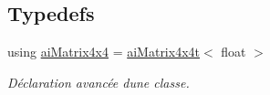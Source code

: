 \subsection*{Typedefs}
\begin{DoxyCompactItemize}
\item 
\hypertarget{group__utilitaire_ga53988236a3db0c0faa5eb1d8aa6a0742}{}using \hyperlink{group__utilitaire_ga53988236a3db0c0faa5eb1d8aa6a0742}{ai\+Matrix4x4} = \hyperlink{classai_matrix4x4t}{ai\+Matrix4x4t}$<$ float $>$\label{group__utilitaire_ga53988236a3db0c0faa5eb1d8aa6a0742}

\begin{DoxyCompactList}\small\item\em Déclaration avancée d\textquotesingle{}une classe. \end{DoxyCompactList}\end{DoxyCompactItemize}
